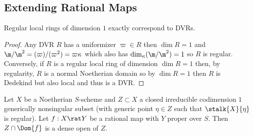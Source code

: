 \subsection{Extending Rational Maps}

\newcommand{\Nil}{\mathcal{N}}

\begin{lemma}
Regular local rings of dimension $1$ exactly correspond to DVRs.
\end{lemma}

\begin{proof}
Any DVR $R$ has a uniformizer $\varpi \in R$ then $\dim{R} = 1$ and $\m / \m^2 = (\varpi)/(\varpi^2) = \varpi \kappa$ which also has $\dim_{\kappa}(\m / \m^2) = 1$ so $R$ is regular.
Conversely, if $R$ is a regular local ring of dimension $\dim{R} = 1$ then, by regularity, $R$ is a normal Noetherian domain so by $\dim{R} = 1$ then $R$ is Dedekind but also local and thus is a DVR. 
\end{proof}

\begin{proposition}
Let $X$ be a Noetherian $S$-scheme and $Z \subset X$ a closed irreducible codimension $1$ generically nonsingular subset (with generic point $\eta \in Z$ such that $\stalk{X}{\eta}$ is regular). Let $f : X \rat Y$ be a rational map with $Y$ proper over $S$. Then $Z \cap \Dom{f}$ is a dense open of $Z$.
\end{proposition}


